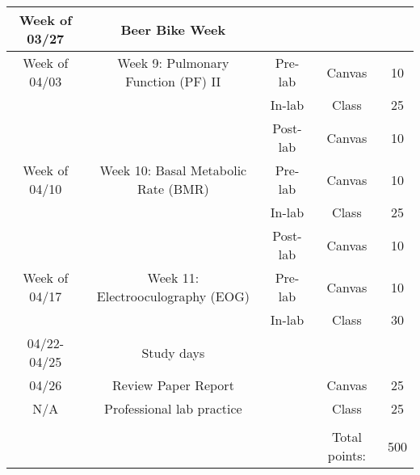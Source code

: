 \documentclass{article}
\begin{document}
\begin{table}[h!]
\begin{tabular}[h!]{ccccc}
	\midrule
	Week of 03/27 & Beer Bike Week & & \\
	\midrule
	Week of 04/03 & Week 9: Pulmonary Function (PF) II & Pre-lab & Canvas & 10\\
		& & In-lab & Class & 25\\
		& & Post-lab & Canvas & 10\\
	Week of 04/10 & Week 10: Basal Metabolic Rate (BMR) & Pre-lab & Canvas & 10\\
		& & In-lab & Class & 25\\
		& & Post-lab & Canvas & 10\\
	Week of 04/17 & Week 11: Electrooculography (EOG) & Pre-lab & Canvas & 10\\
		& & In-lab & Class & 30\\
	\midrule
	04/22-04/25 & Study days & &\\
	\midrule
	04/26 & Review Paper Report & & Canvas & 25\\
	N/A & Professional lab practice & & Class & 25\\
	\bottomrule
	\\
	& & & Total points: & 500\\
\end{tabular}
\end{table}
\end{document}
